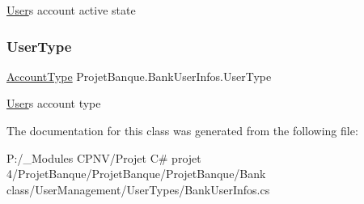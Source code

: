 \mbox{\hyperlink{class_projet_banque_1_1_user}{User}}\textquotesingle{}s account active state 

\mbox{\label{class_projet_banque_1_1_bank_user_infos_a80c4bc1e63d3bbe33d1fcfa2d0096714}} 
\subsubsection{\texorpdfstring{UserType}{UserType}}
{\footnotesize\ttfamily \mbox{\hyperlink{class_projet_banque_1_1_user_a3ab673599238173c9d0ef40e731c0437}{Account\+Type}} Projet\+Banque.\+Bank\+User\+Infos.\+User\+Type\hspace{0.3cm}{\ttfamily [get]}}



\mbox{\hyperlink{class_projet_banque_1_1_user}{User}}\textquotesingle{}s account type 



The documentation for this class was generated from the following file\+:\begin{DoxyCompactItemize}
\item 
P\+:/\+\_\+\+Modules C\+P\+N\+V/\+Projet C\# projet 4/\+Projet\+Banque/\+Projet\+Banque/\+Projet\+Banque/\+Bank class/\+User\+Management/\+User\+Types/Bank\+User\+Infos.\+cs\end{DoxyCompactItemize}
